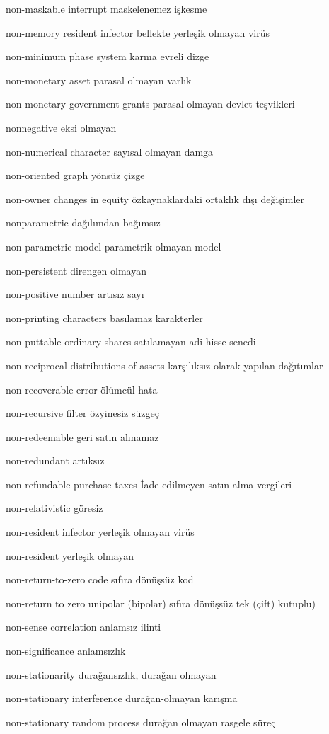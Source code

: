 \documentclass[12pt,fleqn]{article}\usepackage{../../common}
\begin{document}
non-maskable interrupt maskelenemez işkesme

non-memory resident infector bellekte yerleşik olmayan virüs

non-minimum phase system karma evreli dizge

non-monetary asset parasal olmayan varlık

non-monetary government grants parasal olmayan devlet teşvikleri

nonnegative eksi olmayan

non-numerical character sayısal olmayan damga

non-oriented graph yönsüz çizge

non-owner changes in equity özkaynaklardaki ortaklık dışı değişimler

nonparametric dağılımdan bağımsız

non-parametric model parametrik olmayan model

non-persistent direngen olmayan

non-positive number artısız sayı

non-printing characters basılamaz karakterler

non-puttable ordinary shares satılamayan adi hisse senedi

non-reciprocal distributions of assets karşılıksız olarak yapılan dağıtımlar

non-recoverable error ölümcül hata

non-recursive filter özyinesiz süzgeç

non-redeemable geri satın alınamaz

non-redundant artıksız

non-refundable purchase taxes İade edilmeyen satın alma vergileri

non-relativistic göresiz

non-resident infector yerleşik olmayan virüs

non-resident yerleşik olmayan

non-return-to-zero code sıfıra dönüşsüz kod

non-return to zero unipolar (bipolar) sıfıra dönüşsüz tek (çift) kutuplu)

non-sense correlation anlamsız ilinti

non-significance anlamsızlık

non-stationarity durağansızlık, durağan olmayan

non-stationary interference durağan-olmayan karışma

non-stationary random process durağan olmayan rasgele süreç
\end{document}
